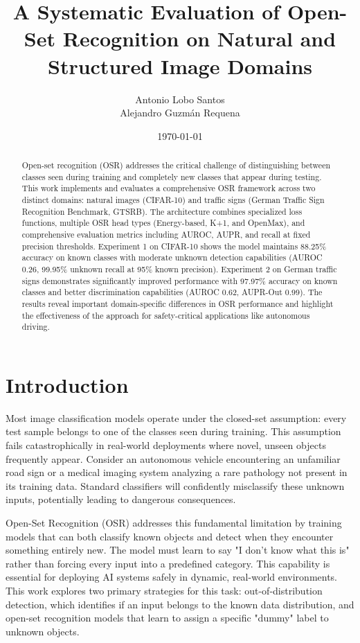 \documentclass[11pt, a4paper]{article}
\title{A Systematic Evaluation of Open-Set Recognition on Natural and Structured Image Domains}
\author{Antonio Lobo Santos \\ Alejandro Guzm\'an Requena}
\date{\today}
\begin{document}
\maketitle
{}

\begin{abstract}
Open-set recognition (OSR) addresses the critical challenge of distinguishing between classes seen during training and completely new classes that appear during testing. This work implements and evaluates a comprehensive OSR framework across two distinct domains: natural images (CIFAR-10) and traffic signs (German Traffic Sign Recognition Benchmark, GTSRB). The architecture combines specialized loss functions, multiple OSR head types (Energy-based, K+1, and OpenMax), and comprehensive evaluation metrics including AUROC, AUPR, and recall at fixed precision thresholds. Experiment 1 on CIFAR-10 shows the model maintains 88.25\% accuracy on known classes with moderate unknown detection capabilities (AUROC 0.26, 99.95\% unknown recall at 95\% known precision). Experiment 2 on German traffic signs demonstrates significantly improved performance with 97.97\% accuracy on known classes and better discrimination capabilities (AUROC 0.62, AUPR-Out 0.99). The results reveal important domain-specific differences in OSR performance and highlight the effectiveness of the approach for safety-critical applications like autonomous driving.
\end{abstract}

\section{Introduction}

Most image classification models operate under the closed-set assumption: every test sample belongs to one of the classes seen during training. This assumption fails catastrophically in real-world deployments where novel, unseen objects frequently appear. Consider an autonomous vehicle encountering an unfamiliar road sign or a medical imaging system analyzing a rare pathology not present in its training data. Standard classifiers will confidently misclassify these unknown inputs, potentially leading to dangerous consequences.

Open-Set Recognition (OSR) addresses this fundamental limitation by training models that can both classify known objects and detect when they encounter something entirely new. The model must learn to say "I don't know what this is" rather than forcing every input into a predefined category. This capability is essential for deploying AI systems safely in dynamic, real-world environments. This work explores two primary strategies for this task: out-of-distribution detection, which identifies if an input belongs to the known data distribution, and open-set recognition models that learn to assign a specific "dummy" label to unknown objects.
\end{document}
